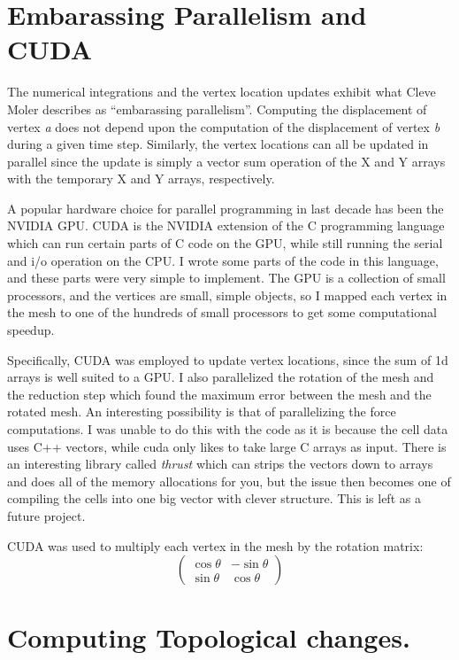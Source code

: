 \section{Embarassing Parallelism and CUDA}
The numerical integrations and the vertex location updates exhibit what Cleve Moler describes as ``embarassing parallelism''. Computing the displacement of vertex \emph{a} does not depend upon the computation of the displacement of vertex \emph{b} during a given time step. Similarly, the vertex locations can all be updated in parallel since the update is simply a vector sum operation of the X and Y arrays with the temporary X and Y arrays, respectively. 

A popular hardware choice for parallel programming in last decade has been the NVIDIA GPU. CUDA is the NVIDIA extension of the C programming language which can run certain parts of C code on the GPU, while still running the serial and i/o operation on the CPU. I wrote some parts of the code in this language, and these parts were very simple to implement. The GPU is a collection of small processors, and the vertices are small, simple objects, so I mapped each vertex in the mesh to one of the hundreds of small processors to get some computational speedup.

Specifically, CUDA was employed to update vertex locations, since the sum of 1d arrays is well suited to a GPU. I also parallelized the rotation of the mesh and the reduction step which found the maximum error between the mesh and the rotated mesh. An interesting possibility is that of parallelizing the force computations. I was unable to do this with the code as it is because the cell data uses C++ vectors, while cuda only likes to take large C arrays as input. There is an interesting library called \emph{thrust} which can strips the vectors down to arrays and does all of the memory allocations for you, but the issue then becomes one of compiling the cells into one big vector with clever structure. This is left as a future project. 

CUDA was used to multiply each vertex in the mesh by the rotation matrix:
\[ \left( \begin{array}{cc}
\cos\theta & -\sin\theta \\
\sin\theta & \cos\theta 
\end{array} \right)\] 

\section{Computing Topological changes.}
